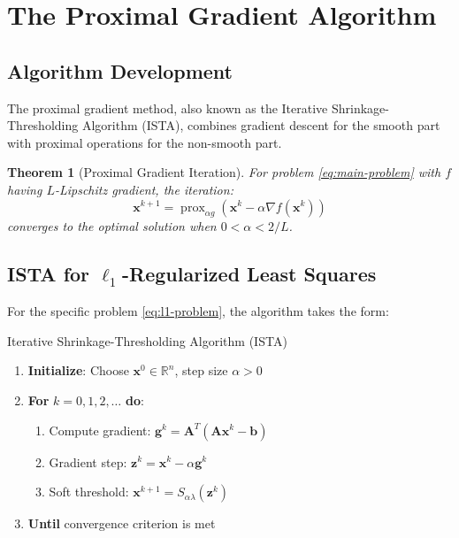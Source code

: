 \documentclass[12pt]{article}
\renewcommand{\vec}[1]{\mathbf{#1}}
\DeclareMathOperator{\prox}{prox}
\newcommand{\R}{\mathbb{R}}
\newtheorem{theorem}{Theorem}[section]
\begin{document}

\newpage
\section{The Proximal Gradient Algorithm}

\subsection{Algorithm Development}

The proximal gradient method, also known as the Iterative Shrinkage-Thresholding Algorithm (ISTA), combines gradient descent for the smooth part with proximal operations for the non-smooth part.

\begin{theorem}[Proximal Gradient Iteration]
    For problem \eqref{eq:main-problem} with $f$ having $L$-Lipschitz gradient, the iteration:
    \begin{equation}\label{eq:prox-grad}
        \vec{x}^{k+1} = \prox_{\alpha g}\left(\vec{x}^k - \alpha \nabla f(\vec{x}^k)\right)
    \end{equation}
    converges to the optimal solution when $0 < \alpha < 2/L$.
\end{theorem}

\subsection{ISTA for $\ell_1$-Regularized Least Squares}

For the specific problem \eqref{eq:l1-problem}, the algorithm takes the form:

\begin{algorithm}
    \caption{Iterative Shrinkage-Thresholding Algorithm (ISTA)}
    \begin{enumerate}
        \item \textbf{Initialize}: Choose $\vec{x}^0 \in \R^n$, step size $\alpha > 0$
        \item \textbf{For} $k = 0, 1, 2, \ldots$ \textbf{do}:
              \begin{enumerate}[label=(\alph*)]
                  \item Compute gradient: $\vec{g}^k = \vec{A}^T(\vec{A}\vec{x}^k - \vec{b})$
                  \item Gradient step: $\vec{z}^k = \vec{x}^k - \alpha \vec{g}^k$
                  \item Soft threshold: $\vec{x}^{k+1} = S_{\alpha\lambda}(\vec{z}^k)$
              \end{enumerate}
        \item \textbf{Until} convergence criterion is met
    \end{enumerate}
\end{algorithm}
\end{document}
